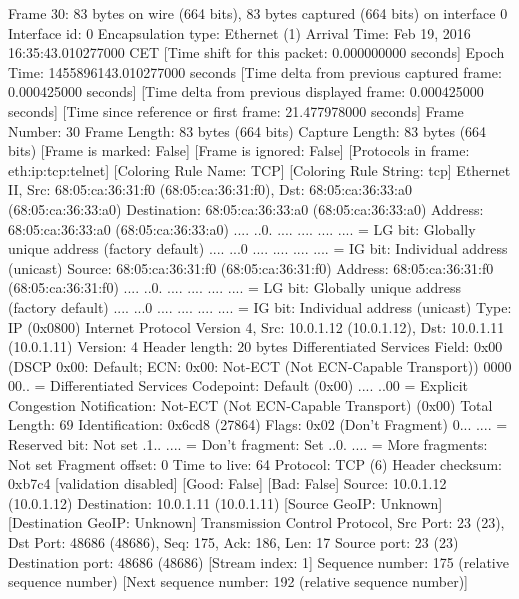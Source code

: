 Frame 30: 83 bytes on wire (664 bits), 83 bytes captured (664 bits) on interface 0
    Interface id: 0
    Encapsulation type: Ethernet (1)
    Arrival Time: Feb 19, 2016 16:35:43.010277000 CET
    [Time shift for this packet: 0.000000000 seconds]
    Epoch Time: 1455896143.010277000 seconds
    [Time delta from previous captured frame: 0.000425000 seconds]
    [Time delta from previous displayed frame: 0.000425000 seconds]
    [Time since reference or first frame: 21.477978000 seconds]
    Frame Number: 30
    Frame Length: 83 bytes (664 bits)
    Capture Length: 83 bytes (664 bits)
    [Frame is marked: False]
    [Frame is ignored: False]
    [Protocols in frame: eth:ip:tcp:telnet]
    [Coloring Rule Name: TCP]
    [Coloring Rule String: tcp]
Ethernet II, Src: 68:05:ca:36:31:f0 (68:05:ca:36:31:f0), Dst: 68:05:ca:36:33:a0 (68:05:ca:36:33:a0)
    Destination: 68:05:ca:36:33:a0 (68:05:ca:36:33:a0)
        Address: 68:05:ca:36:33:a0 (68:05:ca:36:33:a0)
        .... ..0. .... .... .... .... = LG bit: Globally unique address (factory default)
        .... ...0 .... .... .... .... = IG bit: Individual address (unicast)
    Source: 68:05:ca:36:31:f0 (68:05:ca:36:31:f0)
        Address: 68:05:ca:36:31:f0 (68:05:ca:36:31:f0)
        .... ..0. .... .... .... .... = LG bit: Globally unique address (factory default)
        .... ...0 .... .... .... .... = IG bit: Individual address (unicast)
    Type: IP (0x0800)
Internet Protocol Version 4, Src: 10.0.1.12 (10.0.1.12), Dst: 10.0.1.11 (10.0.1.11)
    Version: 4
    Header length: 20 bytes
    Differentiated Services Field: 0x00 (DSCP 0x00: Default; ECN: 0x00: Not-ECT (Not ECN-Capable Transport))
        0000 00.. = Differentiated Services Codepoint: Default (0x00)
        .... ..00 = Explicit Congestion Notification: Not-ECT (Not ECN-Capable Transport) (0x00)
    Total Length: 69
    Identification: 0x6cd8 (27864)
    Flags: 0x02 (Don't Fragment)
        0... .... = Reserved bit: Not set
        .1.. .... = Don't fragment: Set
        ..0. .... = More fragments: Not set
    Fragment offset: 0
    Time to live: 64
    Protocol: TCP (6)
    Header checksum: 0xb7c4 [validation disabled]
        [Good: False]
        [Bad: False]
    Source: 10.0.1.12 (10.0.1.12)
    Destination: 10.0.1.11 (10.0.1.11)
    [Source GeoIP: Unknown]
    [Destination GeoIP: Unknown]
Transmission Control Protocol, Src Port: 23 (23), Dst Port: 48686 (48686), Seq: 175, Ack: 186, Len: 17
    Source port: 23 (23)
    Destination port: 48686 (48686)
    [Stream index: 1]
    Sequence number: 175    (relative sequence number)
    [Next sequence number: 192    (relative sequence number)]
